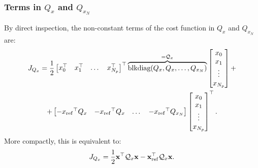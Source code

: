 \documentclass[a4paper,12pt,fleqn]{article}
\newcommand{\varxvec}{\mathbf{x}}
\newcommand{\Np}{{N_p}}
\newcommand{\blkdiag}{\text{blkdiag}}
\begin{document}
\subsubsection{Terms in $Q_x$ and $Q_{x_N}$}
By direct inspection, the non-constant terms of the cost function in $Q_x$ and $Q_{x_N}$ are:
\begin{multline}
\label{eq:J_Qx}
 J_{Q_x} = \frac{1}{2}
 \begin{bmatrix}
  x_0^\top & x_1^\top &\dots & x_{\Np}^\top
 \end{bmatrix}^\top
 \overbrace{\blkdiag(Q_x, Q_x, \dots, Q_{x_N})}^{=\mathcal{Q}_x}
 \begin{bmatrix}
  x_0 \\  x_1\\ \vdots\\  x_{\Np}
 \end{bmatrix} + \\
 +
  \begin{bmatrix}
  -{x_{\rm ref}}^\top Q_x & -{x_{\rm ref}}^\top Q_x &\dots & -{x_{\rm ref}}^\top Q_{x_N}
 \end{bmatrix} 
 \begin{bmatrix}
  x_0 \\ x_1 \\ \vdots \\ x_{\Np}
 \end{bmatrix}^\top.
 \end{multline}
 More compactly, this is equivalent to:
 \begin{equation}
  J_{Q_x} = \frac{1}{2} \varxvec^\top \mathcal{Q}_x \varxvec - \varxvec_{\rm ref}^\top \mathcal{Q}_x \varxvec.
 \end{equation}
\end{document}
